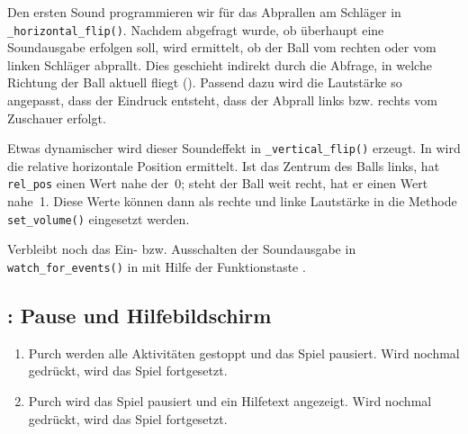 Den ersten Sound programmieren wir für das Abprallen am Schläger in \texttt{\_hori\-zontal\-\_flip()}. Nachdem abgefragt wurde, ob überhaupt eine Soundausgabe erfolgen soll, wird ermittelt, ob der Ball vom rechten oder vom linken Schläger abprallt. Dies geschieht indirekt durch die Abfrage, in welche Richtung der Ball aktuell fliegt (). Passend dazu wird die Lautstärke so angepasst, dass der Eindruck entsteht, dass der Abprall links bzw. rechts vom Zuschauer erfolgt.


Etwas dynamischer wird dieser Soundeffekt in \texttt{\_vertical\_flip()} erzeugt. In  wird die relative horizontale Position ermittelt. Ist das Zentrum des Balls links, hat \texttt{rel\_pos} einen Wert nahe der~0; steht der Ball weit recht, hat er einen Wert nahe~1. Diese Werte können dann als rechte und linke Lautstärke in die Methode \texttt{set\_volume()} eingesetzt werden.


Verbleibt noch das Ein- bzw. Ausschalten der Soundausgabe in \texttt{watch\_for\_events()} in  mit Hilfe der Funktionstaste .


\subsection{: Pause und Hilfebildschirm}

\begin{enumerate}
	\item Purch  werden alle Aktivitäten gestoppt und das Spiel pausiert. Wird nochmal  gedrückt, wird das Spiel fortgesetzt.\label{req0201PauseHelp1}
	
	\item Purch  wird das Spiel pausiert und ein Hilfetext angezeigt. Wird nochmal  gedrückt, wird das Spiel fortgesetzt.\label{req0201PauseHelp2}
\end{enumerate}
\er

